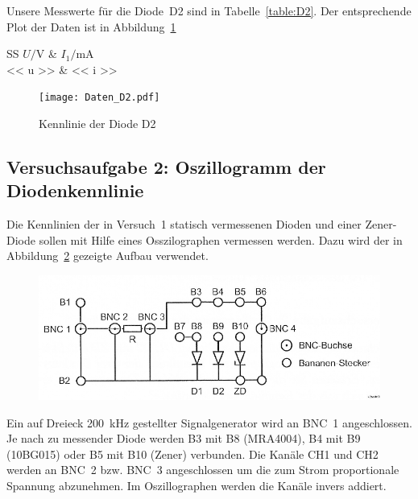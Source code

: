 Unsere Messwerte für die Diode~D2 sind in Tabelle~\ref{table:D2}. Der
entsprechende Plot der Daten ist in Abbildung~\ref{fig:D2}

\begin{table}[htbp]
	\centering
	\caption{%
		Messdaten zur Diode D2
	}
	\label{table:D2}
	\begin{tabular}{SS}
		{$U / \si\volt$} & {$I_1 / \si{\milli\ampere}$} \\
		\hline
		<< u >> & << i >> \\
	\end{tabular}
\end{table}

\begin{figure}[htbp]
	\centering
	\caption{%
		Kennlinie der Diode D2
	}
	\label{fig:D2}
	\texttt{[image: Daten\_D2.pdf]}
\end{figure}

\FloatBarrier
\subsection{Versuchsaufgabe 2: Oszillogramm der Diodenkennlinie}

Die Kennlinien der in Versuch~1 statisch vermessenen Dioden und einer
Zener-Diode sollen mit Hilfe eines Osszilographen vermessen werden. Dazu wird
der in Abbildung~\ref{fig:2-6} gezeigte Aufbau verwendet.

\begin{figure}[htbp]
	\centering
	\caption{%
		\cite[Abbildung~2.6]{physik313-Anleitung}
	}
	\label{fig:2-6}
	\includegraphics[width=.8\linewidth]{Bilder_aus_Anleitung/2-6.png}
\end{figure}

Ein auf Dreieck \SI{200}{\kilo\hertz} gestellter Signalgenerator wird an BNC~1
angeschlossen. Je nach zu messender Diode werden B3 mit B8 (MRA4004), B4 mit B9
(10BG015) oder B5 mit B10 (Zener) verbunden. Die Kanäle CH1 und CH2 werden an
BNC~2 bzw. BNC~3 angeschlossen um die zum Strom proportionale Spannung
abzunehmen. Im Oszillographen werden die Kanäle invers addiert. 

